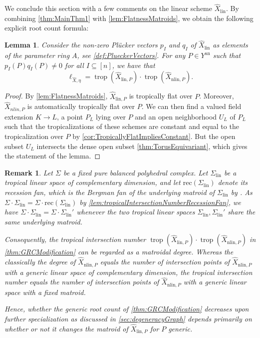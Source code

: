 \documentclass[12pt,reqno,a4paper]{amsart}
\theoremstyle{theoremstyle}
\newtheorem{lemma}[theorem]{Lemma}
\theoremstyle{examplestyle}
\newtheorem{remark}[theorem]{Remark}
\theoremstyle{algorithmstyle}
\newcommand{\lin}{{\mathrm{lin}}}
\newcommand{\nlin}{{\mathrm{nlin}}}
\DeclareMathOperator{\trop}{trop}
\begin{document}
We conclude this section with a few comments on the linear scheme $\widehat{X}_{\mathrm{lin}}$. By combining \cref{thm:MainThm1} with \cref{lem:FlatnessMatroids}, we obtain the following explicit root count formula: %
\begin{lemma}\label{lem:PlueckerCriterion}
  Consider the non-zero Pl\"{u}cker vectors $p_{I}$ and $q_{I}$ of $\widehat{X}_{\mathrm{lin}}$ as elements of the parameter ring $A$, see \cref{def:PlueckerVectors}. For any $P\in{Y^{\mathrm{an}}}$ such that $p_{I}(P)q_{I}(P)\neq{0}$ for all $I\subseteq [n]$, we have that %
  \begin{equation*}
    \ell_{\widehat{X},\eta}=\trop(\widehat X_{\mathrm{lin},P})\cdot\trop(\widehat X_{\mathrm{nlin},P}).
  \end{equation*}
\end{lemma}
\begin{proof}
  By \cref{lem:FlatnessMatroids}, $\hat{X}_{\lin,P}$ is tropically flat over $P$. Moreover, $\hat{X}_{nlin,P}$ is automatically tropically flat over $P$. We can then find a valued field extension $K\to L$, a point $P_{L}$ lying over $P$ and an open neighborhood $U_{L}$ of $P_{L}$ such that the tropicalizations of these schemes are constant and equal to the tropicalization over $P$ by \cref{cor:TropicallyFlatImpliesConstant}. But the open subset $U_{L}$ intersects the dense open subset
  \cref{thm:TorusEquivariant}, which gives the statement of the lemma.
\end{proof}

\begin{remark}
  \label{rem:matroidalDegree}
  Let $\Sigma$ be a fixed pure balanced polyhedral complex.  Let $\Sigma_\lin$ be a tropical linear space of complementary dimension, and let $\text{rec}(\Sigma_\lin)$ denote its recession fan, which is the Bergman fan of the underlying matroid of $\Sigma_\lin$ by \cite[Theorem 4.4.5]{MS15}.  As $\Sigma\cdot\Sigma_\lin=\Sigma\cdot\mathrm{rec}(\Sigma_\lin)$ by \cref{lem:tropicalIntersectionNumberRecessionFan}, we have $\Sigma\cdot\Sigma_\lin = \Sigma\cdot\Sigma_\lin'$ whenever the two tropical linear spaces $\Sigma_\lin, \Sigma_\lin'$ share the same underlying matroid.

  Consequently, the tropical intersection number $\trop(\widehat X_{\lin,P})\cdot\trop(\widehat X_{\nlin,P})$ in \cref{thm:GRCModification} can be regarded as a \emph{matroidal degree}.  Whereas the classically the degree of $\widehat X_{\nlin,P}$ equals the number of intersection points of $\widehat X_{\nlin,P}$ with a generic linear space of complementary dimension, the tropical intersection number equals the number of intersection points of $\widehat X_{\nlin,P}$ with a generic linear space with a fixed matroid.

  Hence, whether the generic root count of \cref{thm:GRCModification} decreases upon further specialization as discussed in \cref{sec:degeneracyGraph} depends primarily on whether or not it changes the matroid of $\widehat X_{\lin,P}$ for $P$ generic.
\end{remark}
\end{document}

